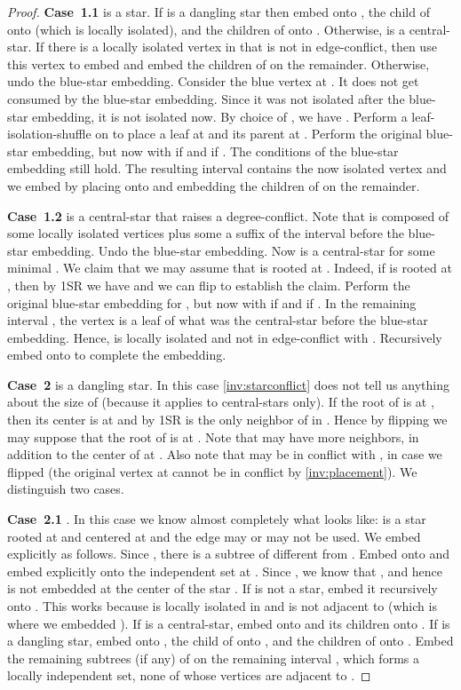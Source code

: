 \documentclass[11pt,a4paper,colorlinks=true,urlcolor=blue,citecolor=red]{article}
\theoremstyle{plain}
\newcommand{\case}[1]{\par\vspace{.5\baselineskip}\noindent\textbf{\sffamily Case~#1}}
\begin{document}
\begin{proof}
  \case{1.1}  is a star. If  is a dangling star then embed 
  onto , the child  of  onto  (which is locally isolated),
  and the children of  onto . Otherwise,  is a
  central-star. If there is a locally isolated vertex in  that
  is not in edge-conflict, then use this vertex to embed  and embed
  the children of  on the remainder. Otherwise, undo the blue-star
  embedding. Consider the blue vertex at . It does not get consumed
  by the blue-star embedding. Since it was not isolated after the
  blue-star embedding, it is not isolated now. By choice of , we
  have . Perform a
  leaf-isolation-shuffle on  to place a leaf  at 
  and its parent at . Perform the original blue-star embedding, but
  now with  if  and  if
  . The conditions of the blue-star embedding still hold. The
  resulting interval  contains the now isolated vertex 
  and we embed  by placing  onto  and embedding the children
  of  on the remainder.

  \case{1.2}  is a central-star that raises a
  degree-conflict. Note that  is composed of some locally
  isolated vertices plus some a suffix of the interval  before
  the blue-star embedding. Undo the blue-star embedding. Now
   is a central-star for some minimal . We claim that we may
  assume that  is rooted at . Indeed, if  is rooted
  at , then by 1SR we have  and we can flip
   to establish the claim. Perform the original blue-star
  embedding for , but now with  if  and  if . In the remaining interval , the
  vertex  is a leaf of what was the central-star  before the
  blue-star embedding. Hence,  is locally isolated and not in
  edge-conflict with . Recursively embed  onto  to
  complete the embedding.

  \case{2}  is a dangling star. In this case \ref{inv:starconflict}
  does not tell us anything about the size of  (because it applies
  to central-stars only). If the root of  is at , then its
  center is at  and by 1SR  is the only neighbor of  in .
  Hence by flipping  we may suppose that the root of  is at
  . Note that  may have more neighbors, in addition to the center
  of  at . Also note that  may be in conflict with , in
  case we flipped  (the original vertex at  cannot be in
  conflict by \ref{inv:placement}). We distinguish two cases.

  \case{2.1} . In this case we know almost completely what 
  looks like:  is a star rooted at  and centered at 
  and the edge  may or may not be used. We embed  explicitly
  as follows. Since , there is a subtree  of
   different from . Embed  onto  and embed 
  explicitly onto the independent set at . Since
  , we know that , and hence  is not
  embedded at the center of the star . If  is not a star,
  embed it recursively onto . This works because  is
  locally isolated in  and  is not adjacent to 
  (which is where we embedded ). If  is a central-star, embed 
  onto  and its children onto . If  is a dangling
  star, embed  onto , the child  of  onto , and
  the children of  onto . Embed the remaining
  subtrees (if any) of  on the remaining interval ,
  which forms a locally independent set, none of whose vertices are
  adjacent to .


\end{proof}
\end{document}
